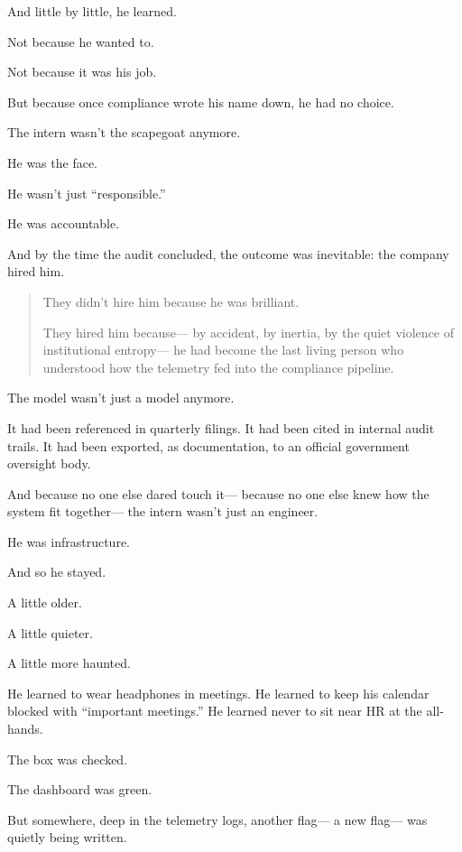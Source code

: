     And little by little, he learned.
    
    Not because he wanted to.
    
    Not because it was his job.
    
    But because once compliance wrote his name down,  
    he had no choice.
    
    The intern wasn’t the scapegoat anymore.
    
    He was the face.
    
    He wasn’t just “responsible.”
    
    He was accountable.
    
    And by the time the audit concluded, the outcome was inevitable: the company hired him.
    
    \begin{quote}
    They didn’t hire him because he was brilliant.
    
    They hired him because—  
    by accident, by inertia, by the quiet violence of institutional entropy—  
    he had become the last living person who understood how the telemetry fed into the compliance pipeline.
    \end{quote}
    
    The model wasn’t just a model anymore.
    
    It had been referenced in quarterly filings.  
    It had been cited in internal audit trails.  
    It had been exported, as documentation, to an official government oversight body.
    
    And because no one else dared touch it—  
    because no one else knew how the system fit together—  
    the intern wasn’t just an engineer.
    
    He was infrastructure.
    
    And so he stayed.
    
    A little older.
    
    A little quieter.
    
    A little more haunted.
    
    He learned to wear headphones in meetings.  
    He learned to keep his calendar blocked with “important meetings.”  
    He learned never to sit near HR at the all-hands.
    
    The box was checked.
    
    The dashboard was green.
    
    But somewhere, deep in the telemetry logs,  
    another flag—  
    a new flag—  
    was quietly being written.
    
